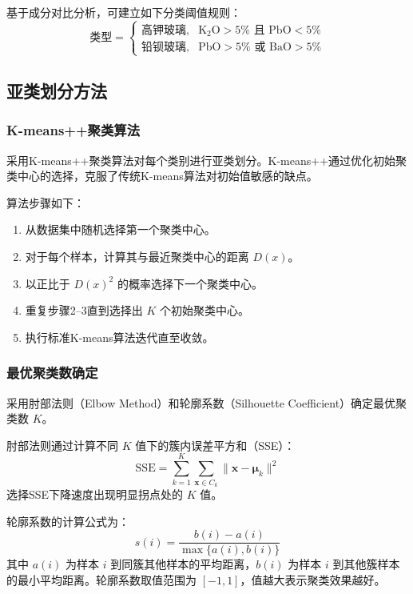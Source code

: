 \documentclass{cumcmthesis}
\begin{document}
基于成分对比分析，可建立如下分类阈值规则：
\begin{equation}
    \text{类型} = 
    \begin{cases}
        \text{高钾玻璃}, & \text{K}_2\text{O} > 5\% \text{ 且 PbO} < 5\% \\
        \text{铅钡玻璃}, & \text{PbO} > 5\% \text{ 或 BaO} > 5\%
    \end{cases}
\end{equation}

\subsection{亚类划分方法}

\subsubsection{K-means++聚类算法}
采用K-means++聚类算法对每个类别进行亚类划分。K-means++通过优化初始聚类中心的选择，克服了传统K-means算法对初始值敏感的缺点。

算法步骤如下：
\begin{enumerate}
    \item 从数据集中随机选择第一个聚类中心。
    \item 对于每个样本，计算其与最近聚类中心的距离 $D(x)$。
    \item 以正比于 $D(x)^2$ 的概率选择下一个聚类中心。
    \item 重复步骤2--3直到选择出 $K$ 个初始聚类中心。
    \item 执行标准K-means算法迭代直至收敛。
\end{enumerate}

\subsubsection{最优聚类数确定}
采用肘部法则（Elbow Method）和轮廓系数（Silhouette Coefficient）确定最优聚类数 $K$。

肘部法则通过计算不同 $K$ 值下的簇内误差平方和（SSE）：
\begin{equation}
    \text{SSE} = \sum_{k=1}^{K}\sum_{\mathbf{x} \in C_k} \|\mathbf{x} - \boldsymbol{\mu}_k\|^2
\end{equation}
选择SSE下降速度出现明显拐点处的 $K$ 值。

轮廓系数的计算公式为：
\begin{equation}
    s(i) = \frac{b(i) - a(i)}{\max\{a(i), b(i)\}}
\end{equation}
其中 $a(i)$ 为样本 $i$ 到同簇其他样本的平均距离，$b(i)$ 为样本 $i$ 到其他簇样本的最小平均距离。轮廓系数取值范围为 $[-1, 1]$，值越大表示聚类效果越好。
\end{document}
